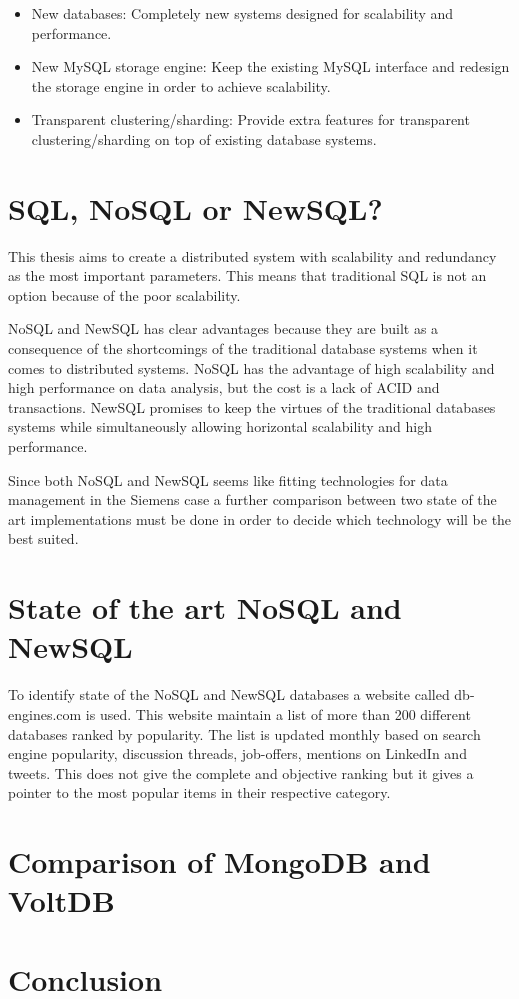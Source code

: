 \begin{itemize}
\item New databases: Completely new systems designed for scalability and performance.
\item New MySQL storage engine: Keep the existing MySQL interface and redesign the storage engine in order to achieve scalability.
\item Transparent clustering/sharding: Provide extra features for transparent clustering/sharding on top of existing database systems. 
\end{itemize}

\section{SQL, NoSQL or NewSQL?}
This thesis aims to create a distributed system with scalability and redundancy as the most important parameters.
This means that traditional SQL is not an option because of the poor scalability.

NoSQL and NewSQL has clear advantages because they are built as a consequence of the shortcomings of the traditional database systems when it comes to distributed systems.
NoSQL has the advantage of high scalability and high performance on data analysis, but the cost is a lack of ACID and transactions.
NewSQL promises to keep the virtues of the traditional databases systems while simultaneously allowing horizontal scalability and high performance.

Since both NoSQL and NewSQL seems like fitting technologies for data management in the Siemens case a further comparison between two state of the art implementations must be done in order to decide which technology will be the best suited.

\section{State of the art NoSQL and NewSQL}
To identify state of the NoSQL and NewSQL databases a website called db-engines.com\cite{db-engines} is used. This website maintain a list of more than 200 different databases ranked by popularity. The list is updated monthly based on search engine popularity, discussion threads, job-offers, mentions on LinkedIn and tweets. This does not give the complete and objective ranking but it gives a pointer to the most popular items in their respective category.

\section{Comparison of MongoDB and VoltDB}

\section{Conclusion}